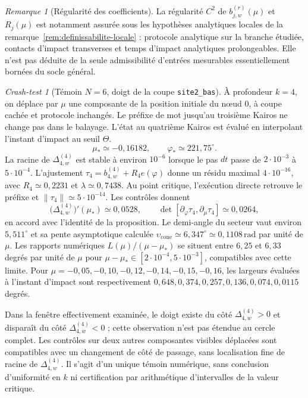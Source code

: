 \documentclass[11pt,a4paper]{article}
\theoremstyle{definition}
\theoremstyle{remark}
\newtheorem{remark}[definition]{Remarque}
\newtheorem{crashtest}[definition]{Crash-test}
\begin{document}
\begin{remark}[Régularité des coefficients]
La régularité $C^2$ de $b_{j,w}^{(r)}(\mu)$ et $R_j(\mu)$ est notamment assurée sous les hypothèses analytiques locales de la remarque~\ref{rem:definissabilite-locale} : protocole analytique sur la branche étudiée, contacts d'impact transverses et temps d'impact analytiques prolongeables. Elle n'est pas déduite de la seule admissibilité d'entrées mesurables essentiellement bornées du socle général.
\end{remark}

\begin{crashtest}[Témoin $N=6$, doigt de la coupe \texttt{site2\_bas}]
À profondeur $k=4$, on déplace par $\mu$ une composante de la position initiale du nœud $0$, à coupe cachée et protocole inchangés. Le préfixe de mot jusqu'au troisième Kairos ne change pas dans le balayage. L'état au quatrième Kairos est évalué en interpolant l'instant d'impact au seuil $\Theta$.
\[
 \boxed{\mu_*\simeq -0{,}16182,\qquad
 \varphi_*\simeq221{,}75^\circ.}
\]
La racine de $\Delta_{4,w}^{(4)}$ est stable à environ $10^{-6}$ lorsque le pas $dt$ passe de $2\cdot10^{-3}$ à $5\cdot10^{-4}$. L'ajustement $\tau_4=b_{4,w}^{(4)}+R_4 e(\varphi)$ donne un résidu maximal $4\cdot10^{-16}$, avec $R_4\simeq0{,}2231$ et $\lambda\simeq0{,}7438$. Au point critique, l'exécution directe retrouve le préfixe et $\|\tau_4\|\simeq5\cdot10^{-14}$. Les contrôles donnent
\[
 \bigl(\Delta_{4,w}^{(4)}\bigr)'(\mu_*)\simeq 0{,}0528,
 \qquad \det[\partial_\varphi\tau_4,\partial_\mu\tau_4]\simeq0{,}0264,
\]
en accord avec l'identité de la proposition. Le demi-angle du secteur vaut environ $5{,}511^\circ$ et sa pente asymptotique calculée $\upsilon_{\mathrm{cone}}\simeq6{,}347^\circ\simeq0{,}1108\,\mathrm{rad}$ par unité de $\mu$. Les rapports numériques $L(\mu)/(\mu-\mu_*)$ se situent entre $6{,}25$ et $6{,}33$ degrés par unité de $\mu$ pour $\mu-\mu_*\in[2\cdot10^{-4},5\cdot10^{-3}]$, compatibles avec cette limite. Pour $\mu=-0{,}05,-0{,}10,-0{,}12,-0{,}14,-0{,}15,-0{,}16$, les largeurs évaluées à l'instant d'impact sont respectivement $0{,}648,0{,}374,0{,}257,0{,}136,0{,}074,0{,}0115$ degrés.

Dans la fenêtre effectivement examinée, le doigt existe du côté $\Delta_{4,w}^{(4)}>0$ et disparaît du côté $\Delta_{4,w}^{(4)}<0$ ; cette observation n'est pas étendue au cercle complet. Les contrôles sur deux autres composantes visibles déplacées sont compatibles avec un changement de côté de passage, sans localisation fine de racine de $\Delta_{4,w}^{(4)}$. Il s'agit d'un unique témoin numérique, sans conclusion d'uniformité en $k$ ni certification par arithmétique d'intervalles de la valeur critique.
\end{crashtest}
\end{document}
